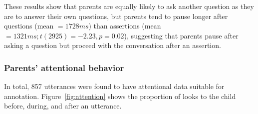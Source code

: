 These results show that parents are equally likely to ask another question as they are to answer their own questions, but parents tend to pause longer after questions (mean $= 1728ms$) than assertions (mean $= 1321ms; t(2925) = -2.23, p = 0.02$), suggesting that parents pause after asking a question but proceed with the conversation after an assertion. %

\subsubsection{Parents' attentional behavior}
\label{sec:engsp:results:gaze}

In total, 857 utterances were found to have attentional data suitable for annotation. Figure~\ref{fig:attention} shows the proportion of looks to the child before, during, and after an utterance.


